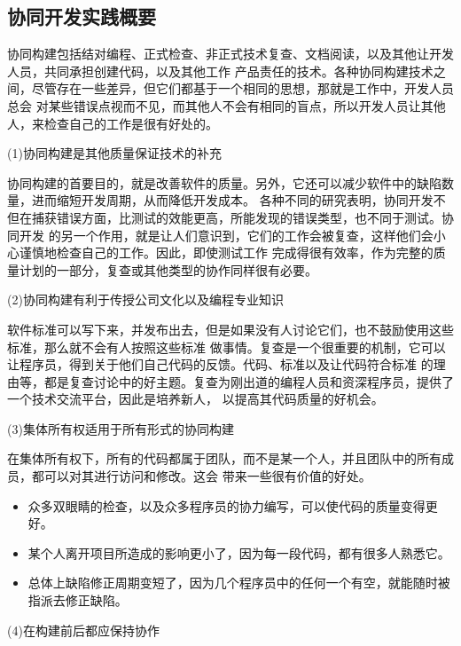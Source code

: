 \documentclass{article}
\begin{document}
\subsection{协同开发实践概要}
协同构建包括结对编程、正式检查、非正式技术复查、文档阅读，以及其他让开发人员，共同承担创建代码，以及其他工作
产品责任的技术。各种协同构建技术之间，尽管存在一些差异，但它们都基于一个相同的思想，那就是工作中，开发人员总会
对某些错误点视而不见，而其他人不会有相同的盲点，所以开发人员让其他人，来检查自己的工作是很有好处的。

\par
(1)协同构建是其他质量保证技术的补充
\par
协同构建的首要目的，就是改善软件的质量。另外，它还可以减少软件中的缺陷数量，进而缩短开发周期，从而降低开发成本。
各种不同的研究表明，协同开发不但在捕获错误方面，比测试的效能更高，所能发现的错误类型，也不同于测试。协同开发
的另一个作用，就是让人们意识到，它们的工作会被复查，这样他们会小心谨慎地检查自己的工作。因此，即使测试工作
完成得很有效率，作为完整的质量计划的一部分，复查或其他类型的协作同样很有必要。

\par
(2)协同构建有利于传授公司文化以及编程专业知识
\par
软件标准可以写下来，并发布出去，但是如果没有人讨论它们，也不鼓励使用这些标准，那么就不会有人按照这些标准
做事情。复查是一个很重要的机制，它可以让程序员，得到关于他们自己代码的反馈。代码、标准以及让代码符合标准
的理由等，都是复查讨论中的好主题。复查为刚出道的编程人员和资深程序员，提供了一个技术交流平台，因此是培养新人，
以提高其代码质量的好机会。

\par
(3)集体所有权适用于所有形式的协同构建
\par
在集体所有权下，所有的代码都属于团队，而不是某一个人，并且团队中的所有成员，都可以对其进行访问和修改。这会
带来一些很有价值的好处。
\begin{itemize}
    \item 众多双眼睛的检查，以及众多程序员的协力编写，可以使代码的质量变得更好。
    \item 某个人离开项目所造成的影响更小了，因为每一段代码，都有很多人熟悉它。
    \item 总体上缺陷修正周期变短了，因为几个程序员中的任何一个有空，就能随时被指派去修正缺陷。
\end{itemize}

\par
(4)在构建前后都应保持协作
\par
\end{document}
